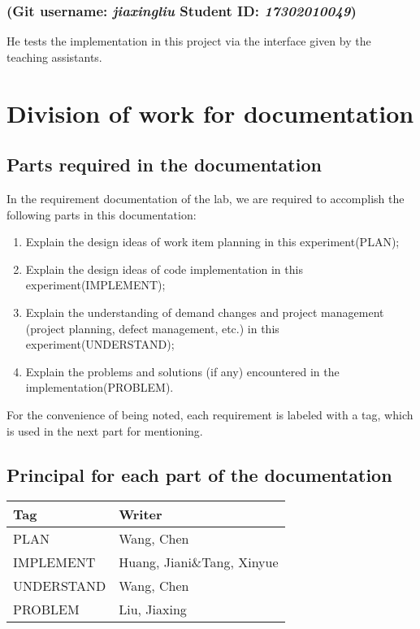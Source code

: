 \documentclass[a4paper]{report}
\begin{document}
\subsubsection{(Git username: \emph{jiaxingliu} Student ID: \emph{17302010049})}
He tests the implementation in this project via the interface given by the teaching assistants.
\section{Division of work for documentation}
\subsection{Parts required in the documentation}
In the requirement documentation of the lab, we are required to accomplish the following parts in this documentation:
\begin{enumerate}
\item Explain the design ideas of work item planning in this experiment(PLAN);
\item Explain the design ideas of code implementation in this experiment(IMPLEMENT);
\item Explain the understanding of demand changes and project management (project planning, defect management, etc.) in this experiment(UNDERSTAND);
\item Explain the problems and solutions (if any) encountered in the implementation(PROBLEM).
\end{enumerate}
For the convenience of being noted, each requirement is labeled with a tag, which is used in the next part for mentioning.
\subsection{Principal for each part of the documentation}
\begin{table}[htbp]
\center
\begin{tabular}{|l|l|}
\hline
\textbf{Tag} & \textbf{Writer} \\ \hline
 PLAN&Wang, Chen\\ \hline
 IMPLEMENT&Huang, Jiani\&Tang, Xinyue\\ \hline
 UNDERSTAND&Wang, Chen\\ \hline
 PROBLEM&Liu, Jiaxing\\ \hline
\end{tabular}
\end{table}



\end{document}
